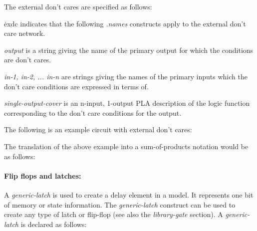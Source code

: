 {\begin{pespace}
The external don't cares are specified as follows:

\begin{description}
\item {\.exdc} indicates that the following {\em .names} constructs
apply to the external don't care network.
\item {\em output} is a string giving the name of the primary output for
which the conditions are don't cares.

\item {\em in-1, in-2, ... in-n} are strings giving the names of the primary
inputs which the don't care conditions are expressed in terms of.

\item {\em single-output-cover} is an n-input, 1-output PLA
description of the logic function corresponding to the don't care
conditions for the output.
\end{description}

The following is an example circuit with external don't cares:

The translation of the above example into a sum-of-products
notation would be as follows:

\paragraph{Flip flops and latches:}

A {\em generic-latch} is used to create a delay element in a
model.  It represents one bit of memory or state information.  The {\em
generic-latch} construct can be used to create any type of latch or
flip-flop (see also the {\em library-gate} section).  A {\em generic-latch}
is declared as follows:


\end{pespace}}
